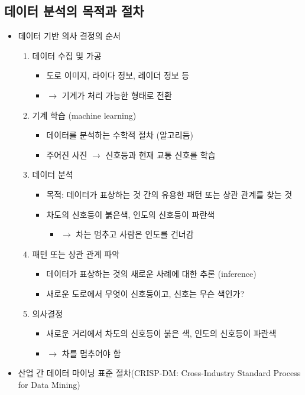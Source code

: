 \subsection{데이터 분석의 목적과 절차}
\begin{itemize}
\item 데이터 기반 의사 결정의 순서
	\begin{enumerate}
	\item 데이터 수집 및 가공
		\begin{itemize}
		\item 도로 이미지, 라이다 정보, 레이더 정보 등
		\item $\rightarrow$ 기계가 처리 가능한 형태로 전환
		\end{itemize}
	\item 기계 학습 (machine learning)
		\begin{itemize}
		\item 데이터를 분석하는 수학적 절차 (알고리듬)
		\item 주어진 사진 $\rightarrow$ 신호등과 현재 교통 신호를 학습
		\end{itemize}
	\item 데이터 분석
		\begin{itemize}
		\item 목적: 데이터가 표상하는 것 간의 유용한 패턴 또는 상관 관계를 찾는 것
		\item 차도의 신호등이 붉은색, 인도의 신호등이 파란색
			\begin{itemize}
			\item $\rightarrow$ 차는 멈추고 사람은 인도를 건너감
			\end{itemize}
		\end{itemize}
	\item 패턴 또는 상관 관계 파악
		\begin{itemize}
		\item 데이터가 표상하는 것의 새로운 사례에 대한 추론 (inference)
		\item 새로운 도로에서 무엇이 신호등이고, 신호는 무슨 색인가?
		\end{itemize}
	\item 의사결정
		\begin{itemize}
		\item 새로운 거리에서 차도의 신호등이 붉은 색, 인도의 신호등이 파란색
		\item  $\rightarrow$ 차를 멈추어야 함
		\end{itemize}	
	\end{enumerate}
\item 산업 간 데이터 마이닝 표준 절차(CRISP-DM: Cross-Industry Standard Process for Data Mining)

\end{itemize}

